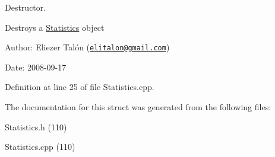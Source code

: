 Destructor. 

Destroys a \hyperlink{struct_statistics}{Statistics} object

\begin{Desc}
\item[Author:]Eliezer Talón (\href{mailto:elitalon@gmail.com}{\tt elitalon@gmail.com}) \end{Desc}
\begin{Desc}
\item[Date:]2008-09-17 \end{Desc}


Definition at line 25 of file Statistics.cpp.

The documentation for this struct was generated from the following files:\begin{CompactItemize}
\item 
Statistics.h (110)\item 
Statistics.cpp (110)\end{CompactItemize}
